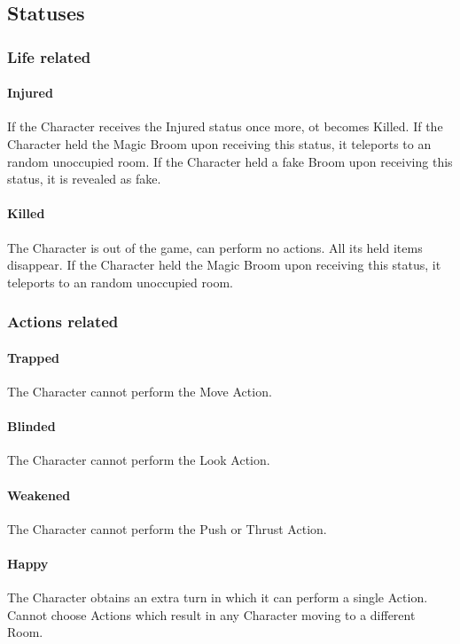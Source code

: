 \subsection{Statuses}

\subsubsection{Life related}

\paragraph{Injured} If the Character receives the Injured status once more, ot becomes Killed. 
If the Character held the Magic Broom upon receiving this status, it teleports to an random unoccupied room. 
If the Character held a fake Broom upon receiving this status, it is revealed as fake.

\paragraph{Killed} The Character is out of the game, can perform no actions. All its held items disappear.
If the Character held the Magic Broom upon receiving this status, it teleports to an random unoccupied room. 

\subsubsection{Actions related}

\paragraph{Trapped} The Character cannot perform the Move Action.
\paragraph{Blinded} The Character cannot perform the Look Action.
\paragraph{Weakened} The Character cannot perform the Push or Thrust Action.

\paragraph{Happy} The Character obtains an extra turn in which it can perform a single Action. Cannot choose Actions which result in any Character moving to a different Room.

